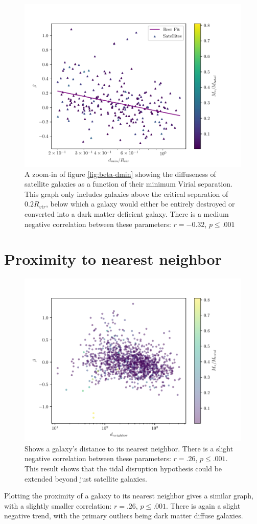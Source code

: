 \begin{figure}
    \centering
    \includegraphics*[width=\textwidth*2/3]{figs/me/beta-dmin-fit.pdf}
    \caption{A zoom-in of figure \ref{fig:beta-dmin} showing the diffuseness of satellite galaxies as a function of their minimum Virial separation. This graph only includes galaxies above the critical separation of $0.2 R_{vir}$, below which a galaxy would either be entirely destroyed or converted into a dark matter deficient galaxy. There is a medium negative correlation between these parameters: $r=-0.32$, $p \leq .001$}
    \label{fig:beta-dmin-fit}
\end{figure}


\section{Proximity to nearest neighbor}

\begin{figure}
    \centering
    \includegraphics*[width=\textwidth*2/3]{figs/me/beta-d_nearest.pdf}
    \caption{Shows a galaxy's distance to its nearest neighbor. There is a slight negative correlation between these parameters: $r = .26$, $p \leq .001$. This result shows that the tidal disruption hypothesis could be extended beyond just satellite galaxies.}

\end{figure}

Plotting the proximity of a galaxy to its nearest neighbor gives a similar graph, with a slightly smaller correlation: $r = .26$, $p \leq .001$. There is again a slight negative trend, with the primary outliers being dark matter diffuse galaxies. 